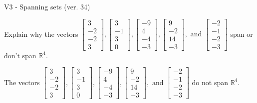 \begin{exercise}
  \begin{exerciseTitle}V3 - Spanning sets (ver. 34)\end{exerciseTitle}
  \begin{exerciseStatement}
    Explain why the vectors \(\left[\begin{array}{r}
3 \\
-2 \\
-2 \\
3
\end{array}\right] , \left[\begin{array}{r}
3 \\
-1 \\
3 \\
0
\end{array}\right] , \left[\begin{array}{r}
-9 \\
4 \\
-4 \\
-3
\end{array}\right] , \left[\begin{array}{r}
9 \\
-2 \\
14 \\
-3
\end{array}\right] , \text{ and } \left[\begin{array}{r}
-2 \\
-1 \\
-2 \\
-3
\end{array}\right]\) span or don't span \(\mathbb{R}^4\). 
	


  \end{exerciseStatement}
  \begin{exerciseAnswer}
   The vectors \(\left[\begin{array}{r}
3 \\
-2 \\
-2 \\
3
\end{array}\right] , \left[\begin{array}{r}
3 \\
-1 \\
3 \\
0
\end{array}\right] , \left[\begin{array}{r}
-9 \\
4 \\
-4 \\
-3
\end{array}\right] , \left[\begin{array}{r}
9 \\
-2 \\
14 \\
-3
\end{array}\right] , \text{ and } \left[\begin{array}{r}
-2 \\
-1 \\
-2 \\
-3
\end{array}\right]\) 
  	 do not  
	span \(\mathbb{R}^4\).
  



\end{exerciseAnswer}
\end{exercise}
